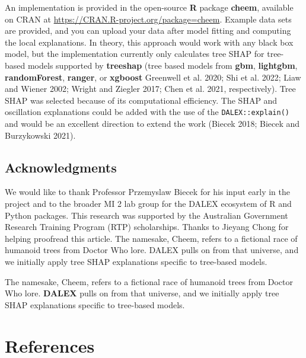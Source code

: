 \documentclass[11pt,twoside]{article}
\begin{document}
An implementation is provided in the open-source \textbf{R} package \textbf{cheem}, available on CRAN at \url{https://CRAN.R-project.org/package=cheem}. Example data sets are provided, and you can upload your data after model fitting and computing the local explanations. In theory, this approach would work with any black box model, but the implementation currently only calculates tree SHAP for tree-based models supported by \textbf{treeshap} (tree based models from \textbf{gbm}, \textbf{lightgbm}, \textbf{randomForest}, \textbf{ranger}, or \textbf{xgboost} Greenwell et al. 2020; Shi et al. 2022; Liaw and Wiener 2002; Wright and Ziegler 2017; Chen et al. 2021, respectively). Tree SHAP was selected because of its computational efficiency. The SHAP and oscillation explanations could be added with the use of the \texttt{DALEX::explain()} and would be an excellent direction to extend the work (Biecek 2018; Biecek and Burzykowski 2021).

\hypertarget{acknowledgments}{%
\subsection*{Acknowledgments}\label{acknowledgments}}

We would like to thank Professor Przemyslaw Biecek for his input early in the project and to the broader MI 2 lab group for the DALEX ecosystem of R and Python packages. This research was supported by the Australian Government Research Training Program (RTP) scholarships. Thanks to Jieyang Chong for helping proofread this article. The namesake, Cheem, refers to a fictional race of humanoid trees from Doctor Who lore. DALEX pulls on from that universe, and we initially apply tree SHAP explanations specific to tree-based models.

The namesake, Cheem, refers to a fictional race of humanoid trees from Doctor Who lore. \textbf{DALEX} pulls on from that universe, and we initially apply tree SHAP explanations specific to tree-based models.

\hypertarget{references}{%
\section*{References}\label{references}}
\end{document}
